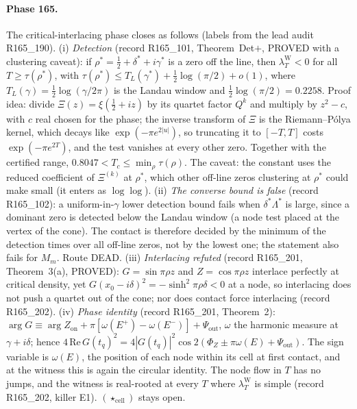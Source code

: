 \documentclass[11pt]{amsart}
\theoremstyle{definition}
\theoremstyle{remark}
\newcommand{\lamW}{\lambda^{\mathrm W}_T}
\begin{document}
\paragraph{Phase 165.} The critical-interlacing phase closes as follows (labels from the lead audit R165\_190).
(i) \emph{Detection} (record R165\_101, Theorem~Det$+$, PROVED with a clustering caveat): if $\rho^*=\frac12+\delta^*+i\gamma^*$ is a zero
off the line, then $\lamW<0$ for all $T\ge\tau(\rho^*)$, with
$\tau(\rho^*)\le T_L(\gamma^*)+\frac12\log(\pi/2)+o(1)$, where $T_L(\gamma)=\frac12\log(\gamma/2\pi)$ is the Landau window and
$\frac12\log(\pi/2)=0.2258$. Proof idea: divide $\Xi(z)=\xi(\frac12+iz)$ by its quartet factor $Q^k$ and multiply by $z^2-c$, with $c$
real chosen for the phase; the inverse transform of $\Xi$ is the Riemann--P\'olya kernel, which decays like $\exp(-\pi e^{2|u|})$, so
truncating it to $[-T,T]$ costs $\exp(-\pi e^{2T})$, and the test vanishes at every other zero. Together with the certified range,
$0.8047<T_c\le\min_\rho\tau(\rho)$. The caveat: the constant uses the reduced coefficient of $\Xi^{(k)}$ at $\rho^*$, which other
off-line zeros clustering at $\rho^*$ could make small (it enters as $\log\log$).
(ii) \emph{The converse bound is false} (record R165\_102): a uniform-in-$\gamma$ lower detection bound fails when $\delta^*\Lambda^*$ is
large, since a dominant zero is detected below the Landau window (a node test placed at the vertex of the cone). The contact is
therefore decided by the minimum of the detection times over all off-line zeros, not by the lowest one; the statement also fails
for $M_m$. Route DEAD.
(iii) \emph{Interlacing refuted} (record R165\_201, Theorem~3(a), PROVED): $G=\sin\pi\rho z$ and $Z=\cos\pi\rho z$ interlace perfectly at
critical density, yet $G(x_0-i\delta)^2=-\sinh^2\pi\rho\delta<0$ at a node, so interlacing does not push a quartet out of the cone;
nor does contact force interlacing (record R165\_202).
(iv) \emph{Phase identity} (record R165\_201, Theorem~2): $\arg G\equiv\arg Z_{\mathrm{on}}+\pi[\omega(E^+)-\omega(E^-)]+\Psi_{\mathrm{out}}$,
$\omega$ the harmonic measure at $\gamma+i\delta$; hence $4\,\mathrm{Re}\,G(t_q)^2=4|G(t_q)|^2\cos2(\Phi_Z\pm\pi\omega(E)+\Psi_{\mathrm{out}})$.
The sign variable is $\omega(E)$, the position of each node within its cell at first contact, and at the witness this is again the
circular identity. The node flow in $T$ has no jumps, and the witness is real-rooted at every $T$ where $\lamW$ is simple (record R165\_202, killer E1).
$(\star_{\mathrm{cell}})$ stays open.
\end{document}
